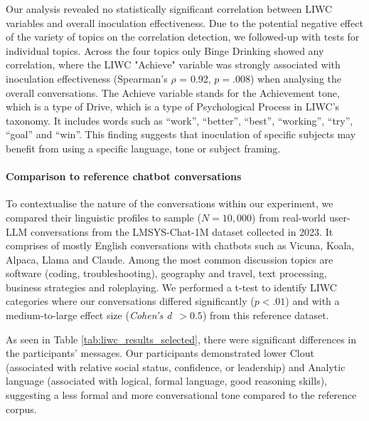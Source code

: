 \documentclass[sigconf]{acmart}
\begin{document}

Our analysis revealed no statistically significant correlation between LIWC variables and overall inoculation effectiveness. 
Due to the potential negative effect of the variety of topics on the correlation detection, we followed-up with tests for individual topics. 
Across the four topics only Binge Drinking showed any correlation, where the LIWC "Achieve" variable was strongly associated with inoculation effectiveness (Spearman's $\rho$ = 0.92, $p = .008$) when analysing the overall conversations. 
The Achieve variable stands for the Achievement tone, which is a type of Drive, which is a type of Psychological Process in LIWC's taxonomy. 
It includes words such as ``work'', ``better'', ``best'', ``working'', ``try'', ``goal'' and ``win''.
This finding suggests that inoculation of specific subjects may benefit from using a specific language, tone or subject framing. 

\paragraph{Comparison to reference chatbot conversations}

To contextualise the nature of the conversations within our experiment, we compared their linguistic profiles to sample ($N = 10,000$) from real-world user-LLM conversations from the LMSYS-Chat-1M dataset \cite{lmsys-chat-1m} collected in 2023. It comprises of mostly English conversations with chatbots such as Vicuna, Koala, Alpaca, Llama and Claude. Among the most common discussion topics are software (coding, troubleshooting), geography and travel, text processing, business strategies and roleplaying. We performed a t-test to identify LIWC categories where our conversations differed significantly ($p < .01$) and with a medium-to-large \cite{Cohen_2009} effect size (\textit{Cohen’s d}~$> 0.5$) from this reference dataset.

As seen in Table \ref{tab:liwc_results_selected}, there were significant differences in the participants' messages. Our participants demonstrated lower Clout (associated with relative social status, confidence, or leadership) and Analytic language (associated with logical, formal language, good reasoning skills), suggesting a less formal and more conversational tone compared to the reference corpus.
\end{document}
